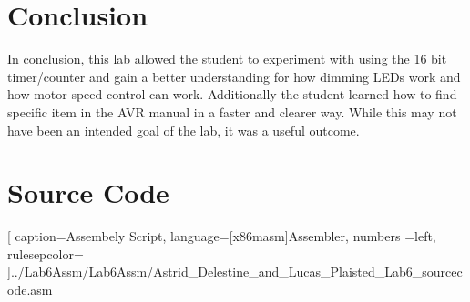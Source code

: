 \documentclass[12pt,letterpaper]{article}
\begin{document}
\section{Conclusion}
In conclusion, this lab allowed the student to experiment with using the 16 bit timer/counter and gain a better understanding for how dimming LEDs work and how motor speed control can work. Additionally the student learned how to find specific item in the AVR manual in a faster and clearer way. While this may not have been an intended goal of the lab, it was a useful outcome.

\pagebreak

\section{Source Code}%

[
caption=Assembely Script,
language={[x86masm]Assembler},
numbers =left,
rulesepcolor=\color{blue}
]{../Lab6Assm/Lab6Assm/Astrid_Delestine_and_Lucas_Plaisted_Lab6_sourcecode.asm}
\end{document}
